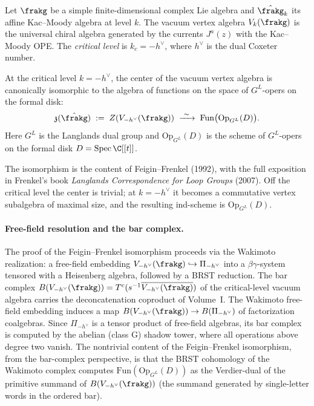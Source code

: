 Let $\frakg$ be a simple finite-dimensional complex Lie algebra and $\hat{\frakg}_k$ its affine Kac--Moody algebra at level $k$. The vacuum vertex algebra $V_k(\frakg)$ is the universal chiral algebra generated by the currents $J^a(z)$ with the Kac--Moody OPE. The \emph{critical level} is $k_c = -h^\vee$, where $h^\vee$ is the dual Coxeter number.

\begin{theorem}
\label{thm:feigin-frenkel-center}
At the critical level $k = -h^\vee$, the center of the vacuum vertex algebra is canonically isomorphic to the algebra of functions on the space of $G^L$-opers on the formal disk:
\[
 \mathfrak{z}(\hat{\frakg}) \;:=\; Z(V_{-h^\vee}(\frakg)) \;\xrightarrow{\ \sim\ }\; \mathrm{Fun}\bigl(\mathrm{Op}_{G^L}(D)\bigr).
\]
Here $G^L$ is the Langlands dual group and $\mathrm{Op}_{G^L}(D)$ is the scheme of $G^L$-opers on the formal disk $D = \mathrm{Spec}\, \C[[t]]$.
\end{theorem}

The isomorphism is the content of Feigin--Frenkel (1992), with the full exposition in Frenkel's book \emph{Langlands Correspondence for Loop Groups} (2007). Off the critical level the center is trivial; at $k = -h^\vee$ it becomes a commutative vertex subalgebra of maximal size, and the resulting ind-scheme is $\mathrm{Op}_{G^L}(D)$.

\paragraph{Free-field resolution and the bar complex.}
The proof of the Feigin--Frenkel isomorphism proceeds via the Wakimoto realization: a free-field embedding $V_{-h^\vee}(\frakg) \hookrightarrow \Pi_{-h^\vee}$ into a $\beta\gamma$-system tensored with a Heisenberg algebra, followed by a BRST reduction. The bar complex $B(V_{-h^\vee}(\frakg)) = T^c(s^{-1}\overline{V_{-h^\vee}(\frakg)})$ of the critical-level vacuum algebra carries the deconcatenation coproduct of Volume~I. The Wakimoto free-field embedding induces a map $B(V_{-h^\vee}(\frakg)) \to B(\Pi_{-h^\vee})$ of factorization coalgebras. Since $\Pi_{-h^\vee}$ is a tensor product of free-field algebras, its bar complex is computed by the abelian (class G) shadow tower, where all operations above degree two vanish. The nontrivial content of the Feigin--Frenkel isomorphism, from the bar-complex perspective, is that the BRST cohomology of the Wakimoto complex computes $\mathrm{Fun}(\mathrm{Op}_{G^L}(D))$ as the Verdier-dual of the primitive summand of $B(V_{-h^\vee}(\frakg))$ (the summand generated by single-letter words in the ordered bar).

